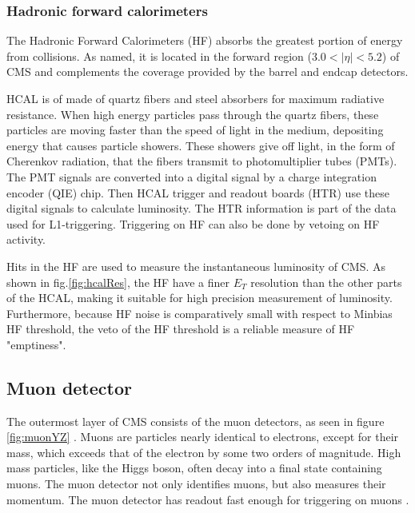 \subsubsection{Hadronic forward calorimeters}

The Hadronic Forward Calorimeters (HF) absorbs the greatest portion of energy from collisions. As named, it is located in the forward region ($3.0<|\eta| < 5.2 $) of CMS and complements the coverage provided by the barrel and endcap detectors.

HCAL is of made of quartz fibers and steel absorbers for maximum radiative resistance. When high energy particles pass through the quartz fibers, these particles are moving faster than the speed of light in the medium, depositing energy that causes particle showers. These showers give off light, in the form of Cherenkov radiation, that the fibers transmit to photomultiplier tubes (PMTs). The PMT signals are converted into a digital signal by a charge integration encoder (QIE) chip. Then HCAL trigger and readout boards (HTR) use these digital signals to calculate luminosity. The HTR information is part of the data used for L1-triggering. Triggering on HF can also be done by vetoing on HF activity. 

Hits in the HF are used to measure the instantaneous luminosity of CMS. As shown in fig.\ref{fig:hcalRes}, the HF have a finer $E_T$ resolution than the other parts of the HCAL, making it suitable for high precision measurement of luminosity. Furthermore, because HF noise is comparatively small with respect to Minbias HF threshold, the veto of the HF threshold is a reliable measure of HF "emptiness". 

\subsection{Muon detector}

The outermost layer of CMS consists of the muon detectors, as seen in figure \ref{fig:muonYZ} \cite{Bayatian:2006nff}. Muons are particles nearly identical to electrons, except for their mass, which exceeds that of the electron by some two orders of magnitude. High mass particles, like the Higgs boson, often decay into a final state containing muons. The muon detector not only identifies muons, but also measures their momentum. The muon detector has readout fast enough for triggering on muons \cite{CMS_AN_2008-098} \cite{cmsTnP}.

